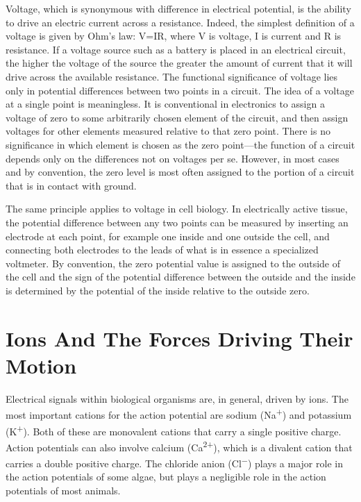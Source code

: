 \documentclass[]{book}
\begin{document}
Voltage, which is synonymous with difference in electrical potential, is the ability to drive an electric current across a resistance. Indeed, the simplest definition of a voltage is given by Ohm's law: V=IR, where V is voltage, I is current and R is resistance. If a voltage source such as a battery is placed in an electrical circuit, the higher the voltage of the source the greater the amount of current that it will drive across the available resistance. The functional significance of voltage lies only in potential differences between two points in a circuit. The idea of a voltage at a single point is meaningless. It is conventional in electronics to assign a voltage of zero to some arbitrarily chosen element of the circuit, and then assign voltages for other elements measured relative to that zero point. There is no significance in which element is chosen as the zero point---the function of a circuit depends only on the differences not on voltages per se. However, in most cases and by convention, the zero level is most often assigned to the portion of a circuit that is in contact with ground.

The same principle applies to voltage in cell biology. In electrically active tissue, the potential difference between any two points can be measured by inserting an electrode at each point, for example one inside and one outside the cell, and connecting both electrodes to the leads of what is in essence a specialized voltmeter. By convention, the zero potential value is assigned to the outside of the cell and the sign of the potential difference between the outside and the inside is determined by the potential of the inside relative to the outside zero.

\hypertarget{ions-and-the-forces-driving-their-motion}{%
\section{Ions And The Forces Driving Their Motion}\label{ions-and-the-forces-driving-their-motion}}

Electrical signals within biological organisms are, in general, driven by ions. The most important cations for the action potential are sodium (Na\textsuperscript{+}) and potassium (K\textsuperscript{+}). Both of these are monovalent cations that carry a single positive charge. Action potentials can also involve calcium (Ca\textsuperscript{2+}), which is a divalent cation that carries a double positive charge. The chloride anion (Cl\textsuperscript{−}) plays a major role in the action potentials of some algae, but plays a negligible role in the action potentials of most animals.
\end{document}
